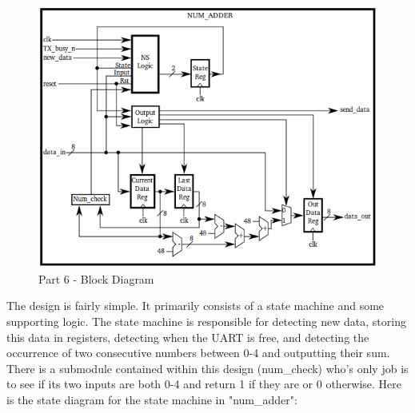 \documentclass{article}
\begin{document}
	\begin{figure}[h]
		\begin{center}
			\includegraphics[scale=0.65]{../block_diagrams/part_6_block_diagram_num_adder.png}
			\caption{Part 6 - Block Diagram}
		\end{center}
	\end{figure}

The design is fairly simple. It primarily consists of a state machine and some supporting logic. The state machine is responsible for detecting new data, storing this data in registers, detecting when the UART is free, and detecting the occurrence of two consecutive numbers between 0-4 and outputting their sum. There is a submodule contained within this design (num\_check) who's only job is to see if its two inputs are both 0-4 and return 1 if they are or 0 otherwise. Here is the state diagram for the state machine in "num\_adder": \\
\end{document}
